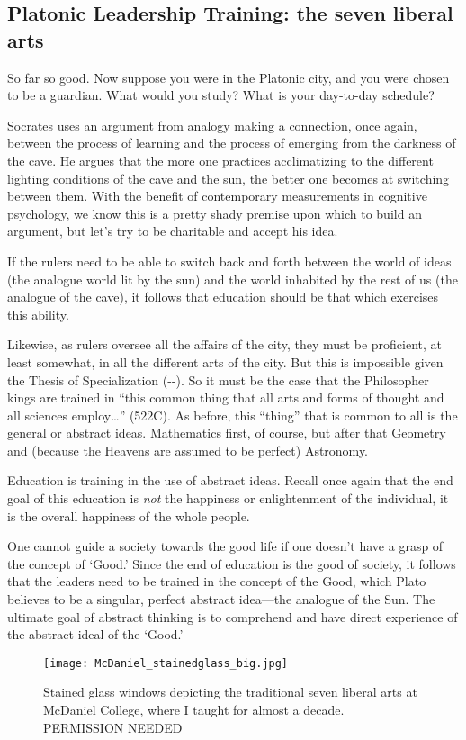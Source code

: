 \subsection{Platonic Leadership Training: the seven liberal arts}
\label{platonicleadershiptraining:thesevenliberalarts}

So far so good. Now suppose you were in the Platonic city, and you were chosen to be a guardian. What would you study? What is your day-to-day schedule?

Socrates uses an argument from analogy making a connection, once again, between the process of learning and the process of emerging from the darkness of the cave. He argues that the more one practices acclimatizing to the different lighting conditions of the cave and the sun, the better one becomes at switching between them. With the benefit of contemporary measurements in cognitive psychology, we know this is a pretty shady premise upon which to build an argument, but let's try to be charitable and accept his idea.

If the rulers need to be able to switch back and forth between the world of ideas (the analogue world lit by the sun) and the world inhabited by the rest of us (the analogue of the cave), it follows that education should be that which exercises this ability. 

Likewise, as rulers oversee all the affairs of the city, they must be proficient, at least somewhat, in all the different arts of the city. But this is impossible given the Thesis of Specialization (--). So it must be the case that the Philosopher kings are trained in ``this common thing that all arts and forms of thought and all sciences employ{\ldots}'' (522C). As before, this ``thing'' that is common to all is the general or abstract ideas. Mathematics first, of course, but after that Geometry and (because the Heavens are assumed to be perfect) Astronomy.

Education is training in the use of abstract ideas. Recall once again that the end goal of this education is \emph{not} the happiness or enlightenment of the individual, it is the overall happiness of the whole people. 

One cannot guide a society towards the good life if one doesn't have a grasp of the concept of `Good.' Since the end of education is the good of society, it follows that the leaders need to be trained in the concept of the Good, which Plato believes to be a singular, perfect abstract idea---the analogue of the Sun. The ultimate goal of abstract thinking is to comprehend and have direct experience of the abstract ideal of the `Good.' \begin{figure*}\texttt{[image: McDaniel\_stainedglass\_big.jpg]}\caption{Stained glass windows depicting the traditional seven liberal arts at McDaniel College, where I taught for almost a decade. PERMISSION NEEDED}\end{figure*}

